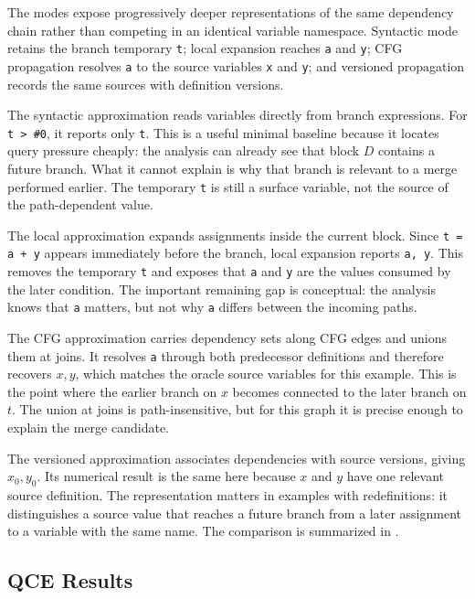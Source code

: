 \documentclass[conference]{IEEEtran}
\begin{document}
The modes expose progressively deeper representations of the same dependency
chain rather than competing in an identical variable namespace. Syntactic mode
retains the branch temporary \texttt{t}; local expansion reaches \texttt{a}
and \texttt{y}; CFG propagation resolves \texttt{a} to the source variables
\texttt{x} and \texttt{y}; and versioned propagation records the same sources
with definition versions.

The syntactic approximation reads variables directly from branch expressions.
For \texttt{t > \#0}, it reports only \texttt{t}. This is a useful minimal
baseline because it locates query pressure cheaply: the analysis can already
see that block \(D\) contains a future branch. What it cannot explain is why
that branch is relevant to a merge performed earlier. The temporary
\texttt{t} is still a surface variable, not the source of the path-dependent
value.

The local approximation expands assignments inside the current block. Since
\texttt{t = a + y} appears immediately before the branch, local expansion
reports \texttt{a, y}. This removes the temporary \texttt{t} and exposes that
\texttt{a} and \texttt{y} are the values consumed by the later condition. The
important remaining gap is conceptual: the analysis knows that \texttt{a}
matters, but not why \texttt{a} differs between the incoming paths.

The CFG approximation carries dependency sets along CFG edges and unions them
at joins. It resolves \texttt{a} through both predecessor definitions and
therefore recovers \(x,y\), which matches the oracle source variables for this
example. This is the point where the earlier branch on \(x\) becomes connected
to the later branch on \(t\). The union at joins is path-insensitive, but for
this graph it is precise enough to explain the merge candidate.

The versioned approximation associates dependencies with source versions,
giving \(x_0,y_0\). Its numerical result is the same here because \(x\) and
\(y\) have one relevant source definition. The representation matters in
examples with redefinitions: it distinguishes a source value that reaches a
future branch from a later assignment to a variable with the same name. The
comparison is summarized in .

\subsection{QCE Results}
\label{sec:qce-results}
\end{document}
